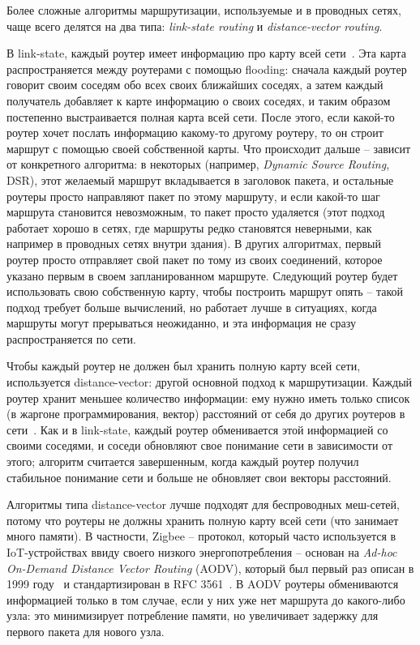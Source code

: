 \documentclass[%
]{report}
\begin{document}
Более сложные алгоритмы маршрутизации,
используемые и в проводных сетях,
чаще всего делятся на два типа:
\emph{link-state routing} и \emph{distance-vector routing}.

В link-state, каждый роутер имеет информацию про карту всей сети~\cite{arpanet_routing}.
Эта карта распространяется между роутерами с помощью flooding:
сначала каждый роутер говорит своим соседям обо всех своих ближайших соседях,
а затем каждый получатель добавляет к карте информацию о своих соседях,
и таким образом постепенно выстраивается полная карта всей сети.
После этого, если какой-то роутер хочет послать информацию какому-то другому роутеру,
то он строит маршрут с помощью своей собственной карты.
Что происходит дальше -- зависит от конкретного алгоритма:
в некоторых (например, \emph{Dynamic Source Routing}, DSR), этот желаемый маршрут вкладывается в заголовок пакета,
и остальные роутеры просто направляют пакет по этому маршруту,
и если какой-то шаг маршрута становится невозможным, то пакет просто удаляется
(этот подход работает хорошо в сетях, где маршруты редко становятся неверными,
как например в проводных сетях внутри здания).
В других алгоритмах, первый роутер просто отправляет свой пакет
по тому из своих соединений, которое указано первым в своем запланированном маршруте.
Следующий роутер будет использовать свою собственную карту, чтобы построить маршрут опять -- 
такой подход требует больше вычислений,
но работает лучше в ситуациях, когда маршруты могут прерываться неожиданно,
и эта информация не сразу распространяется по сети.

Чтобы каждый роутер не должен был хранить полную карту всей сети,
используется distance-vector: другой основной подход к маршрутизации.
Каждый роутер хранит меньшее количество информации:
ему нужно иметь только список (в жаргоне программирования, вектор) расстояний от себя до других роутеров в сети~\cite{rfc1058}.
Как и в link-state, каждый роутер обменивается этой информацией со своими соседями,
и соседи обновляют свое понимание сети в зависимости от этого;
алгоритм считается завершенным, когда каждый роутер получил стабильное понимание сети
и больше не обновляет свои векторы расстояний.

Алгоритмы типа distance-vector лучше подходят для беспроводных меш-сетей,
потому что роутеры не должны хранить полную карту всей сети (что занимает много памяти).
В частности, Zigbee -- протокол, который часто используется в IoT-устройствах ввиду своего низкого
энергопотребления --
основан на \emph{Ad-hoc On-Demand Distance Vector Routing} (AODV),
который был первый раз описан в 1999 году~\cite{perkins1999aodv}
и стандартизирован в RFC 3561~\cite{rfc3561}.
В AODV роутеры обмениваются информацией только в том случае,
если у них уже нет маршрута до какого-либо узла:
это минимизирует потребление памяти,
но увеличивает задержку для первого пакета для нового узла.
\end{document}
